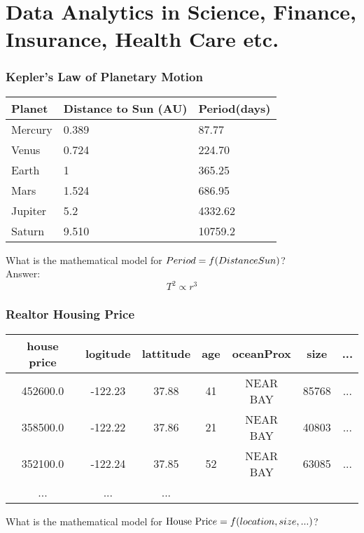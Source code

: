 \documentclass[notheorems, aspectratio=54]{beamer}
\begin{document}
\section{Data Analytics in Science, Finance, Insurance, Health Care etc.}

\begin{frame}
\frametitle{Kepler's Law of Planetary Motion}
\begin{table}[]
\begin{tabular}{lll}
Planet &Distance to Sun (AU) &Period(days)\\
\hline
Mercury	&0.389	&87.77\\
Venus	&0.724	&224.70\\
Earth	&1	&365.25\\
Mars	&1.524	&686.95\\
Jupiter	&5.2	&4332.62\\
Saturn	&9.510	&10759.2\\
\hline
\end{tabular}
\end{table}
What is the mathematical model for $Period=\mathnormal{f}(DistanceSun)$?\\
Answer: $$T^2 \propto r^3$$
\end{frame}

\begin{frame}
\frametitle{Realtor Housing Price}
\begin{table}[]
\begin{tabular} { c c c c c c c}
house price &logitude & lattitude & age  &oceanProx &size &...\\ 
\hline
452600.0 &-122.23	&37.88	&41 	&NEAR BAY &85768 &...\\
358500.0 &-122.22	&37.86	&21		&NEAR BAY &40803 & ...\\
352100.0 &-122.24	&37.85	&52 	&NEAR BAY &63085 & ...\\
... & ... & ... & & & &
\end{tabular}
\end{table}

What is the mathematical model for $\text{House Pric}e=\mathnormal{f}(location, size,  ...)$?

\end{frame}
\end{document}
